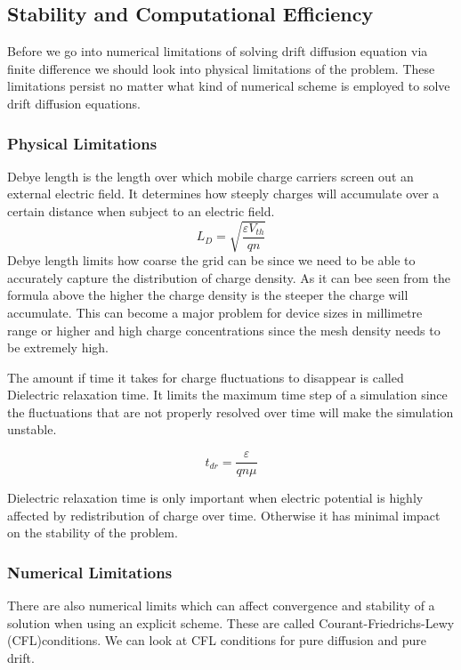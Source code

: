 \subsection{Stability and Computational Efficiency}
Before we go into numerical limitations of solving drift diffusion equation via finite difference we should look into physical limitations of the problem. These limitations persist no matter what kind of numerical scheme is employed to solve drift diffusion equations.

\subsubsection{Physical Limitations}
Debye length is the length over which mobile charge carriers screen out an external electric field. It determines how steeply charges will accumulate over a certain distance when subject to an electric field. 
\begin{equation}
L_D=\sqrt{\frac{\varepsilon V_{th}}{q n}}
\label{debye}
\end{equation}
Debye length limits how coarse the grid can be since we need to be able to accurately capture the distribution of charge density. As it can bee seen from the formula above the higher the charge density is the steeper the charge will accumulate. This can become a major problem for device sizes in millimetre range or higher and high charge concentrations since the mesh density needs to be extremely high.

The amount if time it takes for charge fluctuations to disappear is called Dielectric relaxation time. It limits the maximum time step of a simulation since the fluctuations that are not properly resolved over time will make the simulation unstable.

\begin{equation}
t_{dr}=\frac{\varepsilon}{q n \mu}
\label{tdr}
\end{equation}

Dielectric relaxation time is only important when electric potential is highly affected by redistribution of charge over time. Otherwise it has minimal impact on the stability of the problem.
\subsubsection{Numerical Limitations}

There are also numerical limits which can affect convergence and stability of a solution when using an explicit scheme. These are called Courant-Friedrichs-Lewy (CFL)conditions. We can look at CFL conditions for pure diffusion and pure drift.

